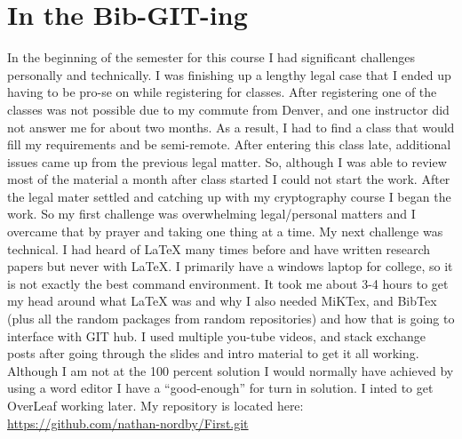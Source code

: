 \documentclass[conference]{journal}
\begin{document}
\section{ In the Bib-GIT-ing}
In the beginning of the semester for this course I had significant challenges personally and technically. I was finishing up a lengthy legal case that I ended up having to be pro-se on while registering for classes. After registering one of the classes was not possible due to my commute from Denver, and one instructor did not answer me for about two months. As a result, I had to find a class that would fill my requirements and be semi-remote. After entering this class late, additional issues came up from the previous legal matter. So, although I was able to review most of the material a month after class started I could not start the work. After the legal mater settled and catching up with my cryptography course I began the work. So my first challenge was overwhelming legal/personal matters and I overcame that by prayer and taking one thing at a time. My next challenge was technical. I had heard of LaTeX many times before and have written research papers but never with LaTeX. I primarily have a windows laptop for college, so it is not exactly the best command environment. It took me about 3-4 hours to get my head around what LaTeX was and why I also needed MiKTex, and BibTex (plus all the random packages from random repositories) and how that is going to interface with GIT hub. I used multiple you-tube videos, and stack exchange posts after going through the slides and intro material to get it all working. Although I am not at the 100 percent solution I would normally have achieved by using a word editor I have a “good-enough” for turn in solution. I inted to get OverLeaf working later. My repository is located here: 
\href{https://github.com/nathan-nordby/First.git}{https://github.com/nathan-nordby/First.git}
\end{document}
